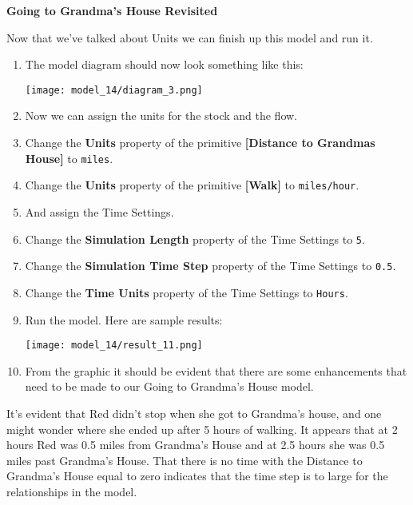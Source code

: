 \documentclass[]{memoir}
\makeatletter
\def\maxwidth{\ifdim\Gin@nat@width>\linewidth\linewidth
\else\Gin@nat@width\fi}
\let\Oldincludegraphics\includegraphics
\renewcommand{\includegraphics}[1]{\Oldincludegraphics[width=\maxwidth]{#1}}
\newcommand{\p}[1]{\textbf{{[}#1{]}}}
\newcommand{\e}[1]{\texttt{#1}}
\renewcommand{\a}[1]{\textbf{#1}}
\makeatother
\begin{document}
\begin{oframed}\textbf{Going to Grandma's House Revisited} 

 Now that we've talked about Units we can finish up this model and run it.

\begin{enumerate}
\item The model diagram should now look something like this: \par \begin{minipage}{\linewidth}  \centering \texttt{[image: model\_14/diagram\_3.png]}
\end{minipage}
\item 

Now we can assign the units for the stock and the flow.


\item  Change the \a{Units} property of the primitive \p{Distance to Grandmas House} to \e{miles}.
\item  Change the \a{Units} property of the primitive \p{Walk} to \e{miles/hour}.
\item 

And assign the Time Settings.


\item  Change the \a{Simulation Length} property of the Time Settings to \e{5}.
\item  Change the \a{Simulation Time Step} property of the Time Settings to \e{0.5}.
\item  Change the \a{Time Units} property of the Time Settings to \e{Hours}.
\item Run the model. Here are sample results:\par \begin{minipage}{\linewidth}  \centering \texttt{[image: model\_14/result\_11.png]}
\end{minipage}
\item 

From the graphic it should be evident that there are some enhancements that need to be made to our Going to Grandma's House model. 



\end{enumerate} \end{oframed}

It's evident that Red didn't stop when she got to Grandma's house, and
one might wonder where she ended up after 5 hours of walking. It appears
that at 2 hours Red was 0.5 miles from Grandma's House and at 2.5 hours
she was 0.5 miles past Grandma's House. That there is no time with the
Distance to Grandma's House equal to zero indicates that the time step
is to large for the relationships in the model.
\end{document}
